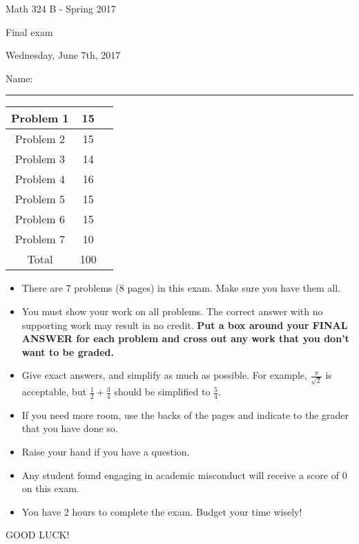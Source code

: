 \documentclass[12 pt]{report}
\begin{document}
\noindent \vfill \noindent \large

\centerline{Math 324 B  - Spring 2017}

\centerline{Final exam}

\centerline{Wednesday, June 7th, 2017}

\normalsize

\vfill
\medskip
Name: \rule{10cm}{1pt}

\bigskip

\vfill
\begin{center}
{\large
\begin{tabular}{||c|c|r||}
\hline Problem 1 & 15 & \hspace{10mm} \hfill \\
\hline Problem 2 & 15 & \hspace{10mm} \hfill \\
\hline Problem 3 & 14 & \hspace{10mm} \hfill \\
\hline Problem 4 & 16  & \hspace{10mm} \hfill \\
\hline Problem 5 & 15  & \hspace{10mm} \hfill \\
\hline Problem 6 &  15 & \hspace{10mm} \hfill \\
\hline Problem 7 & 10 & \hspace{10mm} \hfill \\
\hline Total & 100 & \hspace{10mm} \hfill \\
\hline
\end{tabular}
}
\end{center}
\vfill
\begin{itemize}
\item There are 7 problems (8 pages) in this exam. Make sure you have them all. 
\item You must show your work on all problems.  The correct answer
with no supporting work may result in no credit. \textbf{Put a box
around your FINAL ANSWER for each problem and cross out any work
that you don't want to be graded.} 
\item Give exact answers, and simplify as much as possible. 
For example, $\frac{\pi}{\sqrt{2}}$ is acceptable, but $\frac{1}{2} + \frac{3}{4}$
should be simplified to $\frac{5}{4}$.   

\item If you need more room, use the backs
of the pages and indicate to the grader that you have done so.
\item Raise your hand if you have a question.
\item Any student found engaging in academic misconduct will receive
a score of 0 on this exam.
\item You have 2 hours to complete the exam.  Budget your time wisely! \\
\end{itemize}
\vfill
\begin{center}GOOD LUCK!\end{center}
\end{document}
